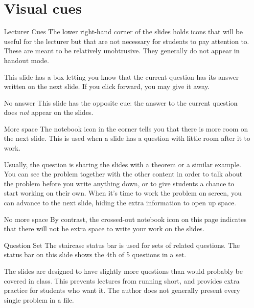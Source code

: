 \documentclass[10pt]{beamer}
\begin{document}
\section{Visual cues}
\frame{\tableofcontents[currentsection]}
\begin{frame}{Lecturer Cues}
The lower right-hand corner of the slides  holds icons that will be useful for the lecturer but that are not necessary for students to pay attention to. These are meant to be relatively unobtrusive. They generally do not appear in handout mode.
\vfill

This slide has a box letting you know that the current question has its answer written on the next slide. If you click forward, you may give it away.
\AnswerYes
\end{frame}
\begin{frame}{No answer}
This slide has the opposite cue: the answer to the current question does \textit{not} appear on the slides. 
\AnswerNo
\end{frame}
\begin{frame}{More space}
The notebook icon in the corner tells you that there is more room on the next slide.
This is used when a slide has a question with little room after it to work.
\vfill

Usually, the question is sharing the slides with a theorem or a similar example.
You can see the problem together with the other content in order to talk about the problem before you write anything down, or to give students a chance to start working on their own. When it's time to work the problem on screen, you can advance to the next slide, hiding the extra information to open up space.
\MoreSpace
\end{frame}
\begin{frame}{No more space}
By contrast, the crossed-out notebook icon on this page indicates that there will not be extra space to write your work on the slides.
\NoSpace
\end{frame}
\begin{frame}{Question Set}
The staircase status bar is used for sets of related questions. The status bar on this slide shows the 4th of 5 questions in a set.\vfill
{}

The slides are designed to have slightly more questions than would probably be covered in class. This prevents lectures from running short, and provides extra practice for students who want it. \alert{The author does not generally present every single problem in a file.} 
\end{frame}
\end{document}
